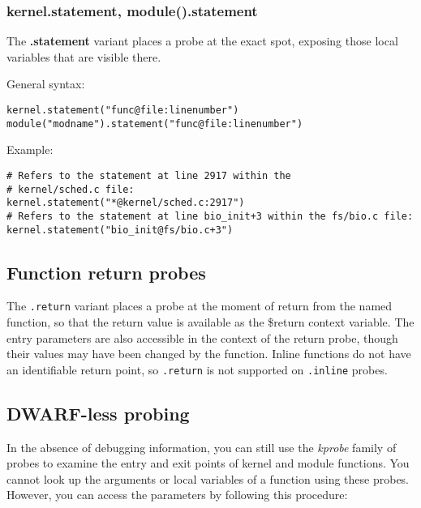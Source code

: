 \documentclass[twoside,english]{article}
\newenvironment{vindent}
{\begin{list}{}{\setlength{\listparindent}{6pt}}
\item[]}
{\end{list}}
\begin{document}
\subsubsection{kernel.statement, module().statement}
The \textbf{.statement} variant places a probe at the exact spot, exposing those local
variables that are visible there.

General syntax:

\begin{vindent}
\begin{verbatim}
kernel.statement("func@file:linenumber")
module("modname").statement("func@file:linenumber")
\end{verbatim}
\end{vindent}
Example:

\begin{vindent}
\begin{verbatim}
# Refers to the statement at line 2917 within the
# kernel/sched.c file:
kernel.statement("*@kernel/sched.c:2917")
# Refers to the statement at line bio_init+3 within the fs/bio.c file:
kernel.statement("bio_init@fs/bio.c+3")
\end{verbatim}
\end{vindent}


\subsection{Function return probes}
The \texttt{.return} variant places a probe at the moment of return from
the named function, so that the return value is available as the \$return
context variable. The entry parameters are also accessible in the context
of the return probe, though their values may have been changed by the function.
Inline functions do not have an identifiable return point, so \texttt{.return}
is not supported on \texttt{.inline} probes.

\subsection{DWARF-less probing}

In the absence of debugging information, you can still use the
\emph{kprobe} family of probes to examine the entry and exit points of
kernel and module functions. You cannot look up the arguments or local
variables of a function using these probes. However, you can access
the parameters by following this procedure:
\end{document}
